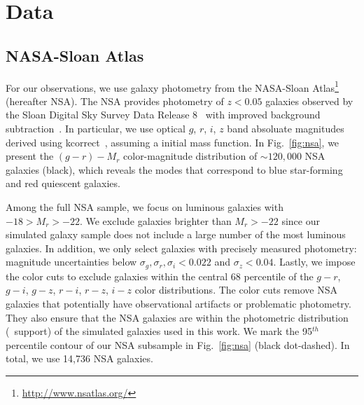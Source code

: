 \section{Data} \label{sec:data}
\subsection{NASA-Sloan Atlas}  \label{sec:nsa}
For our observations, we use galaxy photometry from the NASA-Sloan
Atlas\footnote{\url{http://www.nsatlas.org/}} (hereafter NSA).
The NSA provides photometry of $z < 0.05$ galaxies observed by the Sloan
Digital Sky Survey Data Release 8~\citep[SDSS;][]{aihara2011} with
improved background subtraction~\citep{blanton2011}. 
In particular, we use optical $g$, $r$, $i$, $z$ band absoluate magnitudes
derived using {\sc kcorrect}~\citep{blanton2007}, assuming a
\cite{chabrier2003} initial mass function. 
In Fig.~\ref{fig:nsa}, we present the $(g - r) - M_r$ color-magnitude
distribution of $\sim120,000$ NSA galaxies (black), which reveals the modes 
that correspond to blue star-forming and red quiescent galaxies. 

Among the full NSA sample, we focus on luminous galaxies with 
$-18 > M_r > -22$.
We exclude galaxies brighter than $M_r > -22$ since our simulated galaxy sample
does not include a large number of the most luminous galaxies. 
In addition, we only select galaxies with precisely measured photometry: 
magnitude uncertainties below $\sigma_g, \sigma_r, \sigma_i < 0.022$ and 
$\sigma_z < 0.04$. 
Lastly, we impose the color cuts to exclude galaxies within the
central 68 percentile of the $g-r$, $g-i$, $g-z$, $r-i$, $r-z$, $i-z$ color
distributions.
The color cuts remove NSA galaxies that potentially have observational
artifacts or problematic photometry.
They also ensure that the NSA galaxies are within the photometric distribution
(\ie~support) of the simulated galaxies used in this work.
We mark the 95$^{th}$ percentile contour of our NSA subsample in
Fig.~\ref{fig:nsa} (black dot-dashed).
In total, we use 14,736 NSA galaxies.


